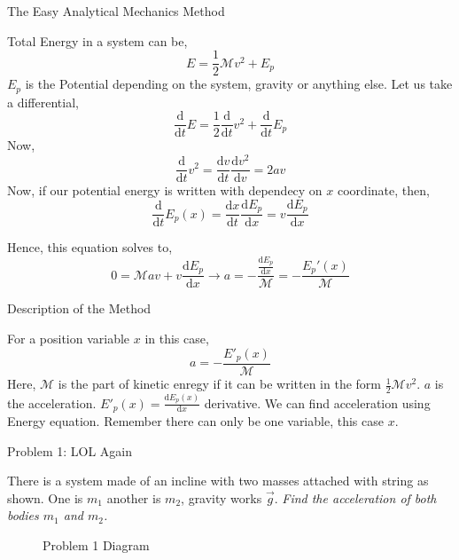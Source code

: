 \documentclass[9pt]{memoir}
\newcommand{\prob}[1]{ \begin{problem.} #1 \end{problem.}}
\newcommand{\id}[1]{ \begin{idea} #1 \end{idea} }
\newcommand{\draw}[3]{ \begin{figure}[hbt!] \centering
 \fontsize{35pt}{20pt}\selectfont \resizebox{#1 \textwidth}{!}{
{#2.pdf_tex}}\caption{#3} \label{#3} \end{figure} }
\begin{document}
\begin{frame}
    {The Easy Analytical Mechanics Method}
    \id{\begin{small} 
        Total Energy in a system can be, 
        \[ E = \frac{1}{2} \mathcal{M} v^2 + E_p \]
        $E_p$ is the Potential depending on the system, gravity or anything else.
        Let us take a differential, 
        \[ \frac{\mathrm{d} }{\mathrm{d}  
        t} E = \frac{1}{2} \frac{\mathrm{d}  }{\mathrm{d}  t} v^2 +
    \frac{\mathrm{d} }{\mathrm{d}  t} E_p       \]
    Now, \[ \frac{\mathrm{d} }{\mathrm{d} t} v^2 = \frac{\mathrm{d} v}{\mathrm{d} t} \frac{\mathrm{d} v^2}{\mathrm{d} v} = 2 a v \]
    Now, if our potential energy is written with dependecy on $x$ coordinate, then, 
    \[ \frac{\mathrm{d} }{\mathrm{d} t} E_p(x) = \frac{\mathrm{d} x}{\mathrm{d} t} \frac{\mathrm{d} E_p}{\mathrm{d} x} = v \frac{\mathrm{d} E_p}{\mathrm{d} x}  \]
    
    Hence, this equation solves to,
    \[ 0 = \mathcal{M} av + v \frac{\mathrm{d} E_p}{\mathrm{d} x}      
    \to
\boxed{ 
    a = - \frac{\frac{\mathrm{d} E_p}{\mathrm{d} x}}{\mathcal{M}} 
    = - \frac{E_p'(x)}{\mathcal{ M}}
}\]
\end{small} 
}       
 

\end{frame}



\begin{frame}
    {Description of the Method}

    \id{ For a position variable $x$ in  this case, 
        \[ a = - \frac{E'_p(x)}{\mathcal{M}} \]
    Here, $\mathcal{M} $ is the part of kinetic enregy if it can be written in the form $\frac{1}{2 } \mathcal{M} v^2$. $a$ is the acceleration. $E'_p(x)= \frac{\mathrm{d} E_p(x)}{\mathrm{d} x}$ derivative. We can find acceleration using Energy equation. Remember there can only be one variable, this case $x$. }
\end{frame}




\begin{frame}
{Problem 1: LOL Again}

    \prob{There is a system made of an incline with two masses attached with
    string as shown. One is $m_1 $ another is $ m_2$, gravity works $\vec{g}$.
\emph{Find the acceleration of both bodies  $m_1$ and $m_2$. }}  
    
    \draw{0.6}{prob1-1}{Problem 1 Diagram} 
    
\end{frame}
\end{document}
